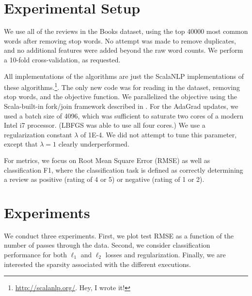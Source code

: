 \documentclass[11pt,leqno,twoside]{article}
\begin{document}
\section{Experimental Setup}

We use all of the reviews in the Books dataset, using the top 40000
most common words after removing stop words. No attempt was made
to remove duplicates, and no additional features were added beyond
the raw word counts. We perform a 10-fold cross-validation, as requested.

All implementations of the algorithms are just the ScalaNLP
implementations of these algorithms.\footnote{\url{http://scalanlp.org/}.
Hey, I wrote it!}.  The only new code was for reading in the dataset,
removing stop words, and the objective function. We parallelized
the objective using the Scala-built-in fork/join framework described
in \citet{prokopec2011Generic}. For the AdaGrad updates, we used a
batch size of 4096, which was sufficient to saturate two cores of
a modern Intel i7 processor. (LBFGS was able to use all four cores.)
We use a regularization constant $\lambda$ of 1E-4. We did not
attempt to tune this parameter, except that $\lambda = 1$ clearly
underperformed.

For metrics, we focus on Root Mean Square Error (RMSE) as well as
classification F1, where the classification task is defined as
correctly determining a review as positive (rating of 4 or 5) or
negative (rating of 1 or 2).

\section{Experiments}

We conduct three experiments. First, we plot test RMSE as a function
of the number of passes through the data. Second, we consider
classification performance for both $\ell_1$ and $\ell_2$ losses
and regularization. Finally, we are interested the sparsity associated
with the different executions.
\end{document}
